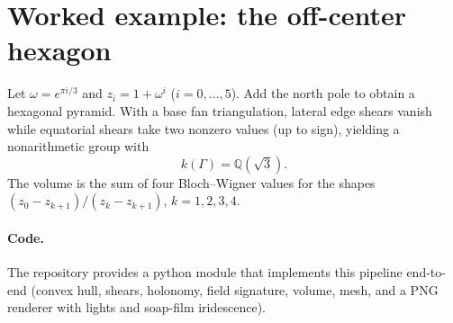 \documentclass[11pt]{article}
\theoremstyle{definition}
\theoremstyle{remark}
\newcommand{\Q}{\mathbb{Q}}
\begin{document}
\section{Worked example: the off-center hexagon}
Let $\omega=e^{\pi i/3}$ and $z_i=1+\omega^i$ ($i=0,\dots,5$). Add the north pole to obtain a hexagonal pyramid. With a base fan triangulation, lateral edge shears vanish while equatorial shears take two nonzero values (up to sign), yielding a nonarithmetic group with
\begin{equation*}
k(\Gamma)=\Q(\sqrt{3}).
\end{equation*}
The volume is the sum of four Bloch--Wigner values for the shapes $(z_0-z_{k+1})/(z_k-z_{k+1})$, $k=1,2,3,4$.
\paragraph{Code.} The repository provides a python module that implements this pipeline end-to-end (convex hull, shears, holonomy, field signature, volume, mesh, and a PNG renderer with lights and soap-film iridescence).
\end{document}
